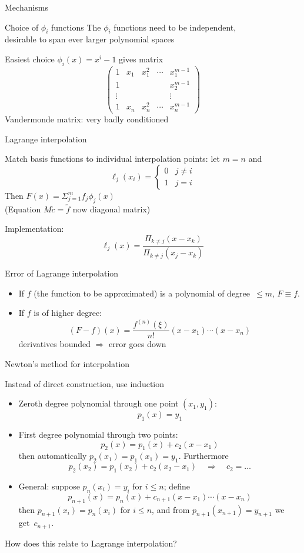  {Mechanisms}

 {Choice of $\phi_i$ functions}
  The $\phi_i$ functions need to be independent,\\
  desirable to span ever larger polynomial spaces

  Easiest choice $\phi_i(x)=x^i-1$ gives matrix
  \[
  \left(\begin{matrix}
    1&x_1&x_1^2&\cdots&x_1^{m-1}\\ 1&&&&x_2^{m-1}\\ \vdots&&&&\vdots\\
    1&x_n&x_n^2&\cdots&x_n^{m-1}
  \end{matrix}\right)
  \]
  Vandermonde matrix: very badly conditioned

 {Lagrange interpolation}
  
  Match basis functions to individual interpolation points: let $m=n$ and
  \[ \ell_j(x_i)=
    \begin{cases}
      0&j\not=i\\ 1&j=i
    \end{cases}
  \]
  Then $F(x)=\Sigma_{j=1}^m f_j\phi_j(x)$\\
  (Equation $M\utilde c=\utilde f$ now diagonal matrix)

  Implementation:
  \[ \ell_j(x)=\frac{\Pi_{k\not=j}(x-x_k)}{\Pi_{k\not=j}(x_j-x_k)} \]


 {Error of Lagrange interpolation}

  \begin{itemize}
  \item If $f$ (the function to be approximated) is a polynomial of
    degree~$\leq m$, $F\equiv f$.
  \item If $f$ is of higher degree:
    \[ (F-f)(x)=\frac{f^{(n)}(\xi)}{n!}(x-x_1)\cdots(x-x_n) \]
    derivatives bounded $\Rightarrow$ error goes down
  \end{itemize}


 {Newton's method for interpolation}

Instead of direct construction, use induction
\begin{itemize}
\item Zeroth degree polynomial through one point $(x_1,y_1)$:
\[ p_1(x)=y_1 \]
\item First degree polynomial through two points:
\[ p_2(x) = p_1(x)+c_2(x-x_1) \]
then automatically $p_2(x_1) = p_1(x_1)=y_1$. Furthermore
\[ p_2(x_2)=p_1(x_2)+c_2(x_2-x_1)\quad\Rightarrow\quad c_2=\ldots \]
\item General: suppose $p_n(x_i)=y_i$ for $i\leq n$; define
\[ p_{n+1}(x)=p_n(x)+c_{n+1}(x-x_1)\cdots(x-x_n) \]
then $p_{n+1}(x_i)=p_n(x_i)$ for $i\leq n$, and
from $p_{n+1}(x_{n+1})=y_{n+1}$ we get~$c_{n+1}$.
\end{itemize}
How does this relate to Lagrange interpolation?


